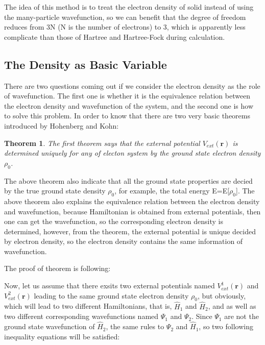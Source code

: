 \documentclass[a4paper]{report}
\newtheorem{thm}{Theorem}
\begin{document}
\noindent The idea of this method is to treat the electron density of solid instead of using the many-particle wavefunction, so we can
 benefit that the degree of freedom reduces from 3N (N is the number of electrons) to 3, which is apparently less complicate than 
those of Hartree and Hartree-Fock during calculation. 

\subsection{The Density as Basic Variable}
\noindent There are two questions coming out if we consider the electron density as the role of wavefunction. The first one is whether it
 is the equivalence relation between the electron density and wavefunction of the system, and the second one is how to solve this 
problem. In order to know that there are two very basic theorems introduced by Hohenberg and Kohn:

\begin{thm}
\label{hk1}
\noindent The first theorem says that the external potential $V_\textit{ext}(\textbf{r})$  is determined uniquely for any of electon system by the ground state electron density $\rho_0$.
\end{thm}

\noindent The above theorem also indicate that all the ground state properties are decied by the true ground state density $\rho_0$,
for example, the total energy E=E[$\rho_0$]. 
\noindent The above theorem also explains the equivalence relation between the electron density and wavefunction, because Hamiltonian is obtained from external potentials,
then one can get the wavefunction, so the corresponding electron density is determined, however, from the theorem, the external potential is unique decided by electron
density, so the electron density contains the same information of wavefunction.

\noindent The proof of theorem is following:

\noindent Now, let us assume that there exsits two external potentials named $V^{1}_\textit{ext}(\textbf{r})$ and $V^{2}_\textit{ext}(\textbf{r})$ leading to the same ground state 
electron density $\rho_0$, but obviously, which will lead to two different Hamiltonians, that is, $\hat{H}_{1}$ and $\hat{H}_{2}$, and as well as two different corresponding
wavefunctions named $\Psi_1$ and $\Psi_2$. Since $\Psi_1$ are not the ground state wavefunction of $\hat{H}_{2}$, the same rules to $\Psi_2$ and $\hat{H}_{1}$, so two following
inequality equations will be satisfied:
\end{document}
